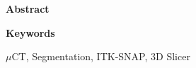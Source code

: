 
\newcommand*{\AbstractHead}[1]{%
{\noindent\color{header-blue}\Large\textbf{#1}}
\vspace{10pt}\\
}%

\newcommand*{\SomeSpace}{%
\vspace{\baselineskip}
}

\AbstractHead{Abstract}
\noindent
\normalsize
\begin{body}
\lipsum[1]
\end{body}
\SomeSpace
\AbstractHead{Keywords}
\label{s:Keywords}
\normalsize
\noindent
\begin{body}
\noindent
$\mu$CT, Segmentation, ITK-SNAP, 3D Slicer
\end{body}
\glsresetall
\SomeSpace

\SomeSpace
\normalsize

\glsresetall
